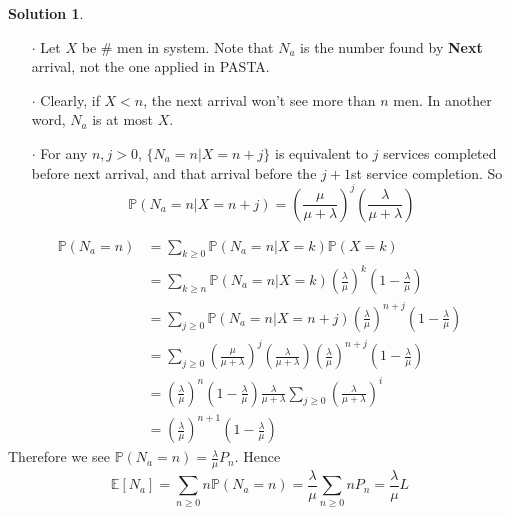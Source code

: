 \documentclass[a4paper, 10pt]{article}
\theoremstyle{definition}
\theoremstyle{hSol}
\newtheorem*{solution}{Solution}
\begin{document}
\begin{solution} 
\begin{itemize}
  \item[$\cdot$] Let $X$ be \# men in system. Note that $N_a$ is the number found by \textbf{Next} arrival, not the one applied in PASTA.
  \item[$\cdot$] Clearly, if $X<n$, the next arrival won't see more than $n$ men. In another word, $N_a$ is at most $X$.
  \item[$\cdot$] For any $n,j>0$, $\{N_a = n|X=n+j\}$ is equivalent to $j$ services completed before next arrival, and that arrival before the $j+1$st service completion. So 
  $$
  \mathbb{P}\left(N_a = n|X=n+j\right) = \left(\frac{\mu}{\mu+\lambda}\right)^j\left(\frac{\lambda}{\mu+\lambda}\right)
  $$
\end{itemize}
\begin{equation}
  \begin{split}
    \mathbb{P}\left(N_a = n\right) &= \sum_{k\geq 0} \mathbb{P}\left(N_a = n|X=k\right)  \mathbb{P}\left(X=k\right) \\
    &= \sum_{k\geq n} \mathbb{P}\left(N_a = n|X=k\right)  \left(\frac{\lambda}{\mu}\right)^k \left(1-\frac{\lambda}{\mu}\right) \\
    &= \sum_{j\geq 0} \mathbb{P}\left(N_a = n|X=n+j\right)  \left(\frac{\lambda}{\mu}\right)^{n+j} \left(1-\frac{\lambda}{\mu}\right)\\
    &= \sum_{j\geq 0} \left(\frac{\mu}{\mu+\lambda}\right)^j\left(\frac{\lambda}{\mu+\lambda}\right)  \left(\frac{\lambda}{\mu}\right)^{n+j} \left(1-\frac{\lambda}{\mu}\right) \\
    &= \left(\frac{\lambda}{\mu}\right)^n\left(1-\frac{\lambda}{\mu}\right)\frac{\lambda}{\mu+\lambda}\sum_{j\geq 0}\left(\frac{\lambda}{\mu+\lambda}\right)^i \\
    &= \left(\frac{\lambda}{\mu}\right)^{n+1}\left(1-\frac{\lambda}{\mu}\right)
  \end{split}
\end{equation}
Therefore we see $\mathbb{P}\left(N_a = n\right)=\frac{\lambda}{\mu} P_n$. Hence
\begin{equation}
  \mathbb{E}\left[N_a\right] = \sum_{n\geq 0} n \mathbb{P}\left(N_a=n\right) = \frac{\lambda}{\mu}\sum_{n\geq 0} n P_n = \frac{\lambda}{\mu} L
\end{equation}
\end{solution}
\end{document}
